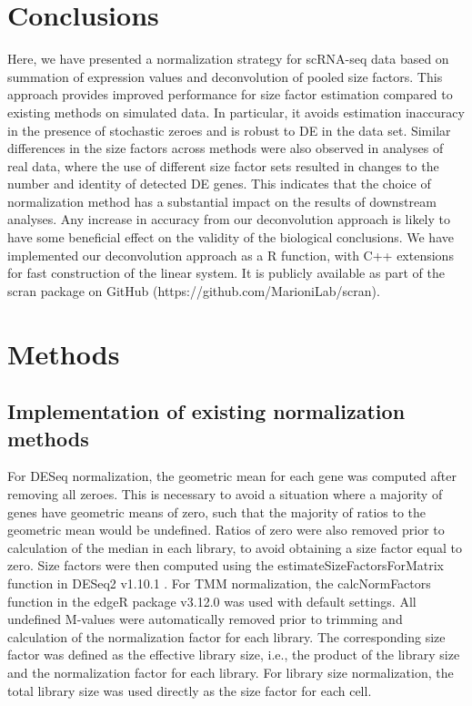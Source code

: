 \documentclass{bmcart}
\begin{document}
\section*{Conclusions}
Here, we have presented a normalization strategy for scRNA-seq data based on summation of expression values and deconvolution of pooled size factors.
This approach provides improved performance for size factor estimation compared to existing methods on simulated data.
In particular, it avoids estimation inaccuracy in the presence of stochastic zeroes and is robust to DE in the data set.
Similar differences in the size factors across methods were also observed in analyses of real data,
    where the use of different size factor sets resulted in changes to the number and identity of detected DE genes.
This indicates that the choice of normalization method has a substantial impact on the results of downstream analyses.
Any increase in accuracy from our deconvolution approach is likely to have some beneficial effect on the validity of the biological conclusions.
We have implemented our deconvolution approach as a R function, with C++ extensions for fast construction of the linear system.
It is publicly available as part of the scran package on GitHub ({https://github.com/MarioniLab/scran}).

\section*{Methods}

\subsection*{Implementation of existing normalization methods}
For DESeq normalization, the geometric mean for each gene was computed after removing all zeroes.
This is necessary to avoid a situation where a majority of genes have geometric means of zero, such that the majority of ratios to the geometric mean would be undefined.
Ratios of zero were also removed prior to calculation of the median in each library, to avoid obtaining a size factor equal to zero.
Size factors were then computed using the estimateSizeFactorsForMatrix function in DESeq2 v1.10.1 \cite{love2014moderated}.
For TMM normalization, the calcNormFactors function in the edgeR package v3.12.0 \cite{robinson2010edgeR} was used with default settings.
All undefined M-values were automatically removed prior to trimming and calculation of the normalization factor for each library.
The corresponding size factor was defined as the effective library size, i.e., the product of the library size and the normalization factor for each library.
For library size normalization, the total library size was used directly as the size factor for each cell.
\end{document}
